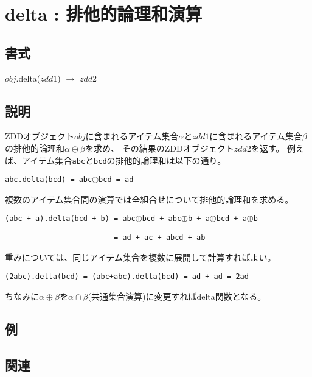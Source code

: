 
\section{delta : 排他的論理和演算\label{sect:delta}}
\subsection*{書式}
$obj$.delta($zdd1$) $\rightarrow$ $zdd2$

\subsection*{説明}
ZDDオブジェクト$obj$に含まれるアイテム集合$\alpha$と$zdd1$に含まれるアイテム集合$\beta$の排他的論理和$\alpha \oplus \beta$を求め、
その結果のZDDオブジェクト$zdd2$を返す。
例えば、アイテム集合\verb|abc|と\verb|bcd|の排他的論理和は以下の通り。

\verb|abc.delta(bcd) = abc|$\oplus$\verb|bcd = ad|

複数のアイテム集合間の演算では全組合せについて排他的論理和を求める。

\verb|(abc + a).delta(bcd + b) = abc|$\oplus$\verb|bcd + abc|$\oplus$\verb|b + a|$\oplus$\verb|bcd + a|$\oplus$\verb|b|

\verb|                         = ad + ac + abcd + ab|

重みについては、同じアイテム集合を複数に展開して計算すればよい。

\verb|(2abc).delta(bcd) = (abc+abc).delta(bcd) = ad + ad = 2ad|

ちなみに$\alpha \oplus \beta$を$\alpha \cap \beta$(共通集合演算)に変更すればdelta関数となる。

\subsection*{例}


\subsection*{関連}

